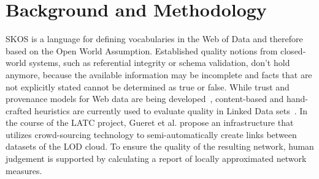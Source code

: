 
\section{Background and Methodology}


SKOS is a language for defining vocabularies in the Web of Data and therefore based on the Open World Assumption. Established quality notions from closed-world systems, such as referential integrity or schema validation, don't hold anymore, because the available information may be incomplete and facts that are not explicitly stated cannot be determined as true or false. While trust and provenance models for Web data are being developed~\cite{Omitola2011,Hartig2009}, content-based and hand-crafted heuristics are currently used to evaluate quality in Linked Data sets~\cite{Heath2011}. In the course of the LATC project, Gueret et al. propose an infrastructure that utilizes crowd-sourcing technology to semi-automatically create links between datasets of the LOD cloud. To ensure the quality of the resulting network, human judgement is supported by calculating a report of locally approximated network measures. 



